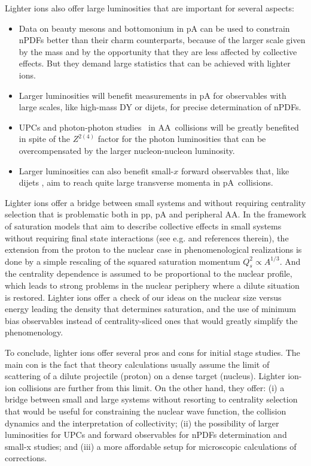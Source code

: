 \documentclass[../report.tex]{subfiles}
\begin{document}
Lighter ions also offer large luminosities that are important for several aspects:
\begin{itemize}
\item Data on beauty mesons and bottomonium in pA can be used to constrain nPDFs \cite{Kusina:2017gkz} better than their charm counterparts, because of the larger scale given by the mass and by the opportunity that they are less affected by collective effects. 
But they demand large statistics that can be achieved with lighter ions.
\item Larger luminosities will benefit measurements in pA for observables with large scales, like high-mass DY or dijets, for precise determination of nPDFs.
\item UPCs and photon-photon studies~\cite{Baltz:2007kq} in AA~collisions will be greatly benefited in spite of the $Z^{2(4)}$ factor for the photon luminosities that can be overcompensated by the larger nucleon-nucleon luminosity.
\item Larger luminosities can also benefit small-$x$ forward observables that, like dijets \cite{Dainese:2016gch}, aim to reach quite large transverse momenta in pA~collisions.
\end{itemize}

Lighter ions offer a bridge between small systems and \PbPb without requiring centrality selection that is problematic both in pp, pA and peripheral AA. 
In the framework of saturation models \cite{Gelis:2010nm} that aim to describe collective effects in small systems without requiring final state interactions (see e.g. \cite{Kovner:2016wsq} and references therein), the extension from the proton to the nuclear case in phenomenological realizations  is done by a simple rescaling of the squared saturation momentum $Q_s^2\propto A^{1/3}$.
And the centrality dependence is assumed to be proportional to the nuclear profile, which leads to strong problems in the nuclear periphery where a dilute situation is restored. Lighter ions offer a check of our ideas on the
nuclear size versus energy leading
the density that determines saturation, and the use of minimum bias observables
instead of centrality-sliced ones that
would greatly simplify the phenomenology.

To conclude, lighter ions offer several pros and cons for initial stage studies. The main con is the fact that theory calculations usually assume the limit of scattering of a dilute projectile (proton) on a dense target (nucleus). Lighter ion-ion collisions are further from this limit. On the other hand, they offer: (i) a bridge between small and large systems without resorting to
centrality selection that would be useful for constraining the nuclear wave function, the
collision dynamics and the interpretation of collectivity;
(ii) the possibility of larger luminosities for UPCs and forward observables
for nPDFs determination and small-x studies; and (iii)
a more affordable setup for microscopic calculations of corrections.
\end{document}
